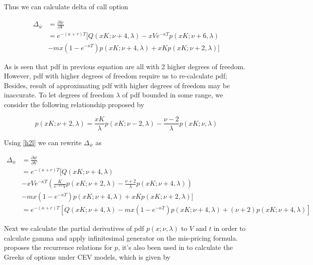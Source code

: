 Thus we can calculate delta of call option

\begin{equation}
    \begin{aligned}
        \Delta_{\bar{w}}&= \frac{\partial \bar{w}}{\partial V} \\
        &= e^{ -(\kappa+r) T} [Q(x K ; \nu+4, \lambda) - xV e^{-\kappa T} p(xK ; \nu+6, \lambda) \\
        &- mx (1-e^{-\kappa T}) p(xK ; \nu+4, \lambda) + xK p(xK ; \nu+2, \lambda)]
        \end{aligned}
\end{equation}

As is seen that pdf in previous equation are all with 2 higher degrees of freedom. However, pdf with higher degrees of freedom require us to re-calculate pdf; Besides, result of approximating pdf with higher degrees of freedom may be inaccurate. To let degrees of freedom $\lambda$ of pdf bounded in some range, we consider the following relationship proposed by \cite{cohen_noncentral_1988}

\begin{equation}\label{h2l}
    p(xK ; \nu+2, \lambda)=\frac{xK}{\lambda} p(xK ; \nu-2, \lambda)-\frac{\nu-2}{\lambda} p(xK ; \nu, \lambda)
\end{equation}

\noindent Using \eqref{h2l} we can rewrite $\Delta_{\bar{w}}$ as

\begin{equation}
    \begin{aligned}
        \Delta_{\bar{w}}&= \frac{\partial \bar{w}}{\partial V} \\
        &= e^{ -(\kappa+r) T} [Q(x K ; \nu+4, \lambda) \\
        &- xV e^{-\kappa T} (\frac{K}{e^{-\kappa T} V} p(xK ; \nu+2, \lambda)-\frac{\nu+2}{\lambda} p(xK ; \nu+4, \lambda) ) \\
        &- mx (1-e^{-\kappa T}) p(xK ; \nu+4, \lambda) + xK p(xK ; \nu+2, \lambda)] \\
        & = e^{ -(\kappa+r) T} [Q(x K ; \nu+4, \lambda) - mx (1-e^{-\kappa T}) p(xK ; \nu+4, \lambda) + (\nu+2 )p(xK ; \nu+4, \lambda)]
        \end{aligned}
\end{equation}

Next we calculate the partial derivatives of pdf $p(x; \nu, \lambda)$ to $V$ and $t$ in order to calculate gamma and apply infinitesimal generator on the mis-pricing formula. \cite{cohen_noncentral_1988} proposes the recurrence relations for $p$, it's also been used in \cite{hossain_comparison_2019} to calculate the Greeks of options under CEV models, which is given by

